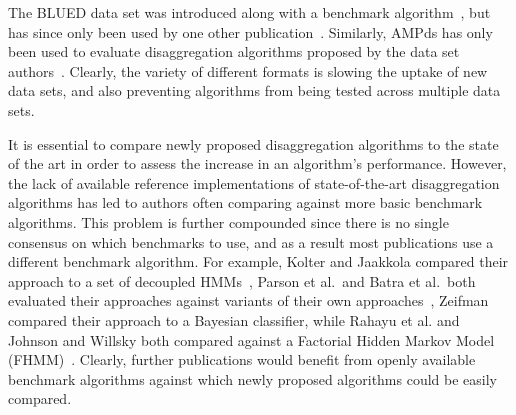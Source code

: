 \documentclass{sig-alternate}
\newcommand{\bluecolor}[1]{\textcolor{blue}{#1}}
\begin{document}
The BLUED data set was introduced along with a benchmark algorithm~\cite{blued}, but has since only been used by one other publication~\cite{anderson_2012}. Similarly, AMPds has only been used to evaluate disaggregation algorithms proposed by the data set authors~\cite{ampds}. Clearly, the variety of different formats is slowing the uptake of new data sets, and also preventing algorithms from being tested across multiple data sets. 

It is essential to compare newly proposed disaggregation algorithms to the state of the art in order to assess the increase in an algorithm's performance. However, the lack of available reference implementations of state-of-the-art disaggregation algorithms has led to authors often comparing against more basic benchmark algorithms. This problem is further compounded since there is no single consensus on which benchmarks to use, and as a result most publications use a different benchmark algorithm. For example, Kolter and Jaakkola compared their approach to a set of decoupled HMMs~\cite{kolter_2012}, Parson et al.\ and Batra et al.\ both evaluated their approaches against variants of their own approaches~\cite{parson_2012,batra_2013}, Zeifman compared their approach to a Bayesian classifier, while Rahayu et al. and Johnson and Willsky both compared against a Factorial Hidden Markov Model (FHMM)~\cite{rahayu_2012,johnson_2013}. Clearly, further publications would benefit from openly available benchmark algorithms against which newly proposed algorithms could be easily compared.

\end{document}
